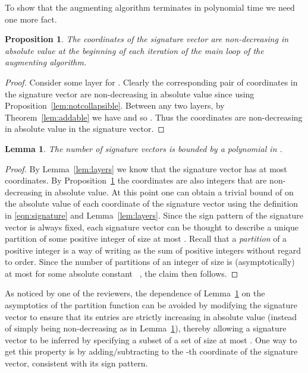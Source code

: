 \documentclass[11pt]{article}
\newtheorem{proposition}[theorem]{Proposition}
\newtheorem{lemma}[theorem]{Lemma}
\theoremstyle{definition}
\theoremstyle{remark}
\begin{document}
To show that the augmenting algorithm terminates in polynomial time we need one more fact.

\begin{proposition}\label{lem:nondecreasing}
  The coordinates of the signature vector are non-decreasing in absolute value at the beginning of each iteration of the main loop of the augmenting algorithm.
\end{proposition}
\begin{proof}
  Consider some layer  for . Clearly the corresponding pair of coordinates  in the signature vector are non-decreasing in absolute value since  using Proposition~\ref{lem:notcollapsible}. Between any two layers, by Theorem~\ref{lem:addable} we have  and so . Thus the coordinates are non-decreasing in absolute value in the signature vector.
\end{proof}

\begin{lemma}\label{lem:sigs}
  The number of signature vectors is bounded by a polynomial in .
\end{lemma}
\begin{proof}
  By Lemma~\ref{lem:layers} we know that the signature vector has at
  most  coordinates. By Proposition~\ref{lem:nondecreasing}
  the coordinates are also integers that are non-decreasing in
  absolute value. At this point one can obtain a trivial bound of
   on the absolute value of each coordinate of the
  signature vector using the definition in
  \eqref{eqn:signature} and Lemma~\ref{lem:layers}. Since the sign
  pattern of the signature vector is always fixed, each signature
  vector can be thought to describe a unique partition of some
  positive integer of size at most . Recall that a
  \emph{partition} of a positive integer  is a way of writing 
  as the sum of positive integers without regard to order. Since the
  number of partitions of an integer of size  is (asymptotically)
  at most  for some absolute constant
  ~\cite{HardyRam18}, the claim then follows.
\end{proof}

As noticed by one of the reviewers, the dependence of
Lemma~\ref{lem:sigs} on the asymptotics of the partition function can
be avoided by modifying the signature vector to ensure that its
entries are strictly increasing in absolute value (instead of simply
being non-decreasing as in Lemma~\ref{lem:nondecreasing}), thereby
allowing a signature vector to be inferred by specifying a subset of a
set of size at most . One way to get this property is by
adding/subtracting  to the -th coordinate of the signature
vector, consistent with its sign pattern.
\end{document}
